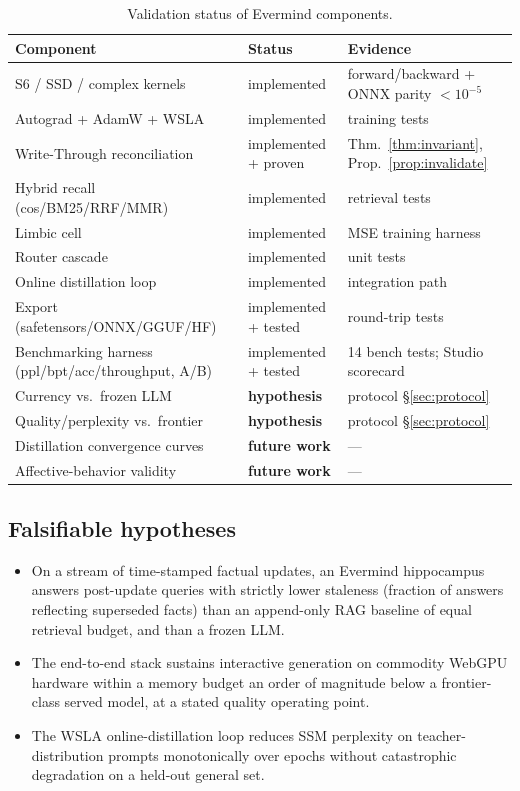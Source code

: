 \documentclass[journal,onecolumn,11pt]{IEEEtran}
\begin{document}
\begin{table}[t]
\caption{Validation status of Evermind components.}
\label{tab:status}
\centering
\small
\begin{tabular}{@{}lll@{}}
\toprule
Component & Status & Evidence \\
\midrule
S6 / SSD / complex kernels & implemented & forward/backward + ONNX parity $<10^{-5}$\\
Autograd + AdamW + WSLA & implemented & training tests \\
Write-Through reconciliation & implemented + proven & Thm.~\ref{thm:invariant}, Prop.~\ref{prop:invalidate} \\
Hybrid recall (cos/BM25/RRF/MMR) & implemented & retrieval tests \\
Limbic cell & implemented & MSE training harness \\
Router cascade & implemented & unit tests \\
Online distillation loop & implemented & integration path \\
Export (safetensors/ONNX/GGUF/HF) & implemented + tested & round-trip tests \\
Benchmarking harness (ppl/bpt/acc/throughput, A/B) & implemented + tested & 14 bench tests; Studio scorecard \\
\midrule
Currency vs.\ frozen LLM & \textbf{hypothesis} & protocol \S\ref{sec:protocol} \\
Quality/perplexity vs.\ frontier & \textbf{hypothesis} & protocol \S\ref{sec:protocol} \\
Distillation convergence curves & \textbf{future work} & --- \\
Affective-behavior validity & \textbf{future work} & --- \\
\bottomrule
\end{tabular}
\end{table}

\subsection{Falsifiable hypotheses}
\begin{itemize}
\item[\textbf{H1} (Currency).] On a stream of time-stamped factual updates, an
Evermind hippocampus answers post-update queries with strictly lower staleness
(fraction of answers reflecting superseded facts) than an append-only RAG
baseline of equal retrieval budget, and than a frozen LLM.
\item[\textbf{H2} (Footprint).] The end-to-end stack sustains interactive
generation on commodity WebGPU hardware within a memory budget an order of
magnitude below a frontier-class served model, at a stated quality operating
point.
\item[\textbf{H3} (Adaptation).] The WSLA online-distillation loop reduces SSM
perplexity on teacher-distribution prompts monotonically over epochs without
catastrophic degradation on a held-out general set.
\end{itemize}
\end{document}
